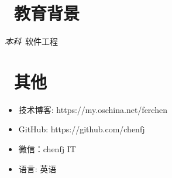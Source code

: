 \documentclass{resume}
\newcommand{\li}{\uline{\hspace{0.5em}}}
\begin{document}
\section{\faGraduationCap\  教育背景}
\textit{本科}\ 软件工程

\section{\faInfo\ 其他}
\begin{itemize}[parsep=0.5ex]
  \item 技术博客: https://my.oschina.net/ferchen
  \item GitHub: https://github.com/chenfj
  \item 微信：chenfj \li IT
  \item 语言: 英语
\end{itemize}

%
%
\end{document}
